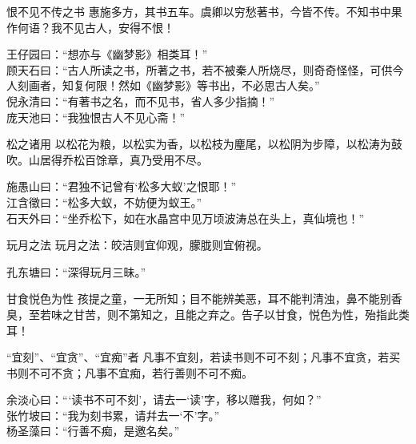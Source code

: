 \begin{yulu}{恨不见不传之书}
惠施多方，其书五车。虞卿以穷愁著书，今皆不传。不知书中果作何语？我不见古人，安得不恨！
\begin{comments}
王仔园曰：“想亦与《幽梦影》相类耳！” \\
顾天石曰：“古人所读之书，所著之书，若不被秦人所烧尽，则奇奇怪怪，可供今人刻画者，知复何限！然如《幽梦影》等书出，不必思古人矣。” \\
倪永清曰：“有著书之名，而不见书，省人多少指摘！” \\
庞天池曰：“我独恨古人不见心斋！”
\end{comments}
\end{yulu}

\begin{yulu}{松之诸用}
以松花为粮，以松实为香，以松枝为麈尾，以松阴为步障，以松涛为鼓吹。山居得乔松百馀章，真乃受用不尽。
\begin{comments}
施愚山曰：“君独不记曾有‘松多大蚁’之恨耶！” \\
江含徵曰：“松多大蚁，不妨便为蚁王。” \\
石天外曰：“坐乔松下，如在水晶宫中见万顷波涛总在头上，真仙境也！”
\end{comments}
\end{yulu}

\begin{yulu}{玩月之法}
玩月之法：皎洁则宜仰观，朦胧则宜俯视。
\begin{comments}
孔东塘曰：“深得玩月三昧。”
\end{comments}
\end{yulu}

\begin{yulu}{甘食悦色为性}
孩提之童，一无所知；目不能辨美恶，耳不能判清浊，鼻不能别香臭，至若味之甘苦，则不第知之，且能之弃之。告子以甘食，悦色为性，殆指此类耳！
\begin{comments}

\end{comments}
\end{yulu}


\begin{yulu}{“宜刻”、“宜贪”、“宜痴”者}
凡事不宜刻，若读书则不可不刻；凡事不宜贪，若买书则不可不贪；凡事不宜痴，若行善则不可不痴。
\begin{comments}
余淡心曰：“‘读书不可不刻’，请去一‘读’字，移以赠我，何如？” \\
张竹坡曰：“我为刻书累，请幷去一‘不’字。” \\
杨圣藻曰：“行善不痴，是邀名矣。”
\end{comments}
\end{yulu}

